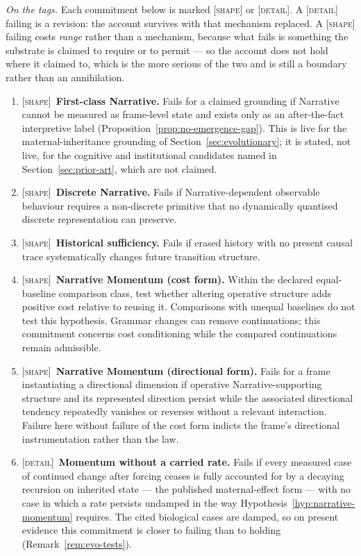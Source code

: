 \documentclass[11pt,a4paper]{article}
\theoremstyle{remark}
\begin{document}
\noindent\emph{On the tags.} Each commitment below is marked \textsc{[shape]} or \textsc{[detail]}.
A \textsc{[detail]} failing is a revision: the account survives with that mechanism replaced. A
\textsc{[shape]} failing costs \emph{range} rather than a mechanism, because what fails is something
the substrate is claimed to require or to permit --- so the account does not hold where it claimed to,
which is the more serious of the two and is still a boundary rather than an annihilation.
\begin{enumerate}[leftmargin=*]
\item \textsc{[shape]}~\textbf{First-class Narrative.} Fails for a claimed grounding if Narrative cannot be measured as frame-level state and exists only as an after-the-fact interpretive label (Proposition~\ref{prop:no-emergence-gap}). This is live for the maternal-inheritance grounding of Section~\ref{sec:evolutionary}; it is stated, not live, for the cognitive and institutional candidates named in Section~\ref{sec:prior-art}, which are not claimed.
\item\label{fals:discrete} \textsc{[shape]}~\textbf{Discrete Narrative.} Fails if Narrative-dependent observable behaviour requires a non-discrete primitive that no dynamically quantised discrete representation can preserve.
\item\label{fals:historical-sufficiency} \textsc{[shape]}~\textbf{Historical sufficiency.} Fails if erased history with no present causal trace systematically changes future transition structure.
\item \textsc{[shape]}~\textbf{Narrative Momentum (cost form).} Within the declared equal-baseline
comparison class, test whether altering operative structure adds positive cost
relative to reusing it. Comparisons with unequal baselines do not test this
hypothesis. Grammar changes can remove continuations; this commitment concerns
cost conditioning while the compared continuations remain admissible.
\item \textsc{[shape]}~\textbf{Narrative Momentum (directional form).} Fails for a frame instantiating a directional dimension if operative Narrative-supporting structure and its represented direction persist while the associated directional tendency repeatedly vanishes or reverses without a relevant interaction. Failure here without failure of the cost form indicts the frame's directional instrumentation rather than the law.
\item\label{fals:carried-rate} \textsc{[detail]}~\textbf{Momentum without a carried rate.} Fails if every measured case of continued change after forcing ceases is fully accounted for by a decaying recursion on inherited state --- the published maternal-effect form --- with no case in which a rate persists undamped in the way Hypothesis~\ref{hyp:narrative-momentum} requires. The cited biological cases are damped, so on present evidence this commitment is closer to failing than to holding (Remark~\ref{rem:evo-tests}).

\end{enumerate}
\end{document}
